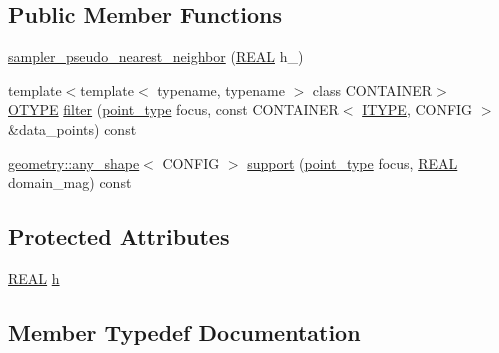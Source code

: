 \subsection*{Public Member Functions}
\begin{DoxyCompactItemize}
\item 
\hyperlink{classmui_1_1sampler__pseudo__nearest__neighbor_a60e4fe931eb8a451a23d08096b40c5a2}{sampler\+\_\+pseudo\+\_\+nearest\+\_\+neighbor} (\hyperlink{classmui_1_1sampler__pseudo__nearest__neighbor_ab053986c2affe4523f82f14e832a259e}{R\+E\+AL} h\+\_\+)
\item 
{\footnotesize template$<$template$<$ typename, typename $>$ class C\+O\+N\+T\+A\+I\+N\+ER$>$ }\\\hyperlink{classmui_1_1sampler__pseudo__nearest__neighbor_a4e8f628c3c9ba7a0a265f19077c32983}{O\+T\+Y\+PE} \hyperlink{classmui_1_1sampler__pseudo__nearest__neighbor_ae5afa7d2d942853facbf71f067b8bc30}{filter} (\hyperlink{classmui_1_1sampler__pseudo__nearest__neighbor_ab639810d9409c0e3fea48d950d6cfe59}{point\+\_\+type} focus, const C\+O\+N\+T\+A\+I\+N\+ER$<$ \hyperlink{classmui_1_1sampler__pseudo__nearest__neighbor_a02306f1df2d4fa21d58a35b4466a3ac5}{I\+T\+Y\+PE}, C\+O\+N\+F\+IG $>$ \&data\+\_\+points) const
\item 
\hyperlink{classmui_1_1geometry_1_1any__shape}{geometry\+::any\+\_\+shape}$<$ C\+O\+N\+F\+IG $>$ \hyperlink{classmui_1_1sampler__pseudo__nearest__neighbor_a5aad2d99fad3163250b4cdaa85169021}{support} (\hyperlink{classmui_1_1sampler__pseudo__nearest__neighbor_ab639810d9409c0e3fea48d950d6cfe59}{point\+\_\+type} focus, \hyperlink{classmui_1_1sampler__pseudo__nearest__neighbor_ab053986c2affe4523f82f14e832a259e}{R\+E\+AL} domain\+\_\+mag) const
\end{DoxyCompactItemize}
\subsection*{Protected Attributes}
\begin{DoxyCompactItemize}
\item 
\hyperlink{classmui_1_1sampler__pseudo__nearest__neighbor_ab053986c2affe4523f82f14e832a259e}{R\+E\+AL} \hyperlink{classmui_1_1sampler__pseudo__nearest__neighbor_ae112902d0fbaa838ee0ce2ee2f3cbcb6}{h}
\end{DoxyCompactItemize}


\subsection{Member Typedef Documentation}
\mbox{\label{classmui_1_1sampler__pseudo__nearest__neighbor_aba0be7385a6c5cd5c6a77321399b86c4}} 
